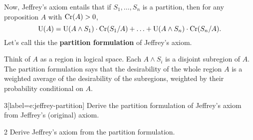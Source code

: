 
Now, Jeffrey's axiom entails that if $S_{1},\ldots,S_{n}$ is a partition, then
for any proposition $A$ with $\text{Cr}(A) > 0$,
\begin{equation*}
  \text{U}(A) = \text{U}(A \land S_1)\cdot \text{Cr}(S_{1}/A) + \ldots + \text{U}(A \land S_{n})\cdot\text{Cr}(S_{n}/A).
\end{equation*}
Let's call this the \textbf{partition formulation} of Jeffrey's axiom.

Think of $A$ as a region in logical space. Each $A \land S_{i}$ is a disjoint
subregion of $A$. The partition formulation says that the desirability of the
whole region $A$ is a weighted average of the desirability of the subregions,
weighted by their probability conditional on $A$.

\begin{exercise}{3}[label=e:jeffrey-partition]
  Derive the partition formulation of Jeffrey's axiom from Jeffrey's (original) axiom.
\end{exercise}

\begin{exercise}{2}
  Derive Jeffrey's axiom from the partition formulation.
\end{exercise}





